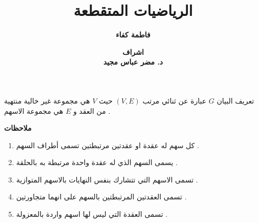 


	\title{الرياضيات المتقطعة}
	\author{\textbf{فاطمة كفاء}}
	\date{\textbf{
اشراف \\
د. مضر عباس مجيد}}

\begin{frame}
	\maketitle
\end{frame}
\timesfont
\begin{frame}
\begin{exampleblock}{تعريف}
	البيان $G$ عبارة عن ثنائي مرتب $(V,E)$ حيث $V$ هي مجموعة غير خالية منتهية من العقد  و $E$ هي مجموعة الاسهم .
\end{exampleblock}

\pause
\noindent
\textbf{ملاحظات}
\begin{enumerate}
	
		\pause
	\item كل سهم له عقدة او عقدتين مرتبطتين تسمى أطراف السهم .
	
	\pause
	\item يسمى السهم الذي له عقدة واحدة مرتبطة به بالحلقة .
	
		\pause
	\item تسمى الاسهم التي تتشارك بنفس النهايات بالاسهم المتوازية .
	
		\pause
	\item تسمى العقدتين المرتبطتين بالسهم على انهما متجاورتين .
	
		\pause
	\item  تسمى العقدة التي ليس لها اسهم واردة بالمعزولة .
\end{enumerate}
\end{frame}
